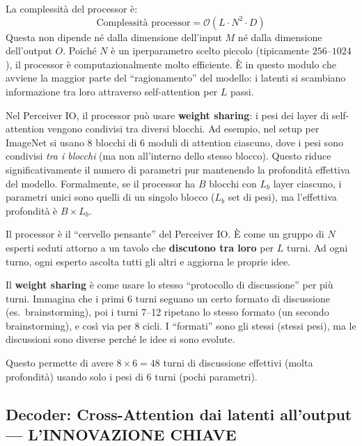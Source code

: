 \documentclass[12pt,a4paper]{article}
\begin{document}
\begin{notabox}
La complessit\`a del processor \`e:
\[
\text{Complessit\`a processor} = \mathcal{O}(L \cdot N^2 \cdot D)
\]
Questa non dipende n\'e dalla dimensione dell'input $M$ n\'e dalla dimensione dell'output $O$. Poich\'e $N$ \`e un iperparametro scelto piccolo (tipicamente $256$--$1024$), il processor \`e computazionalmente molto efficiente. \`E in questo modulo che avviene la maggior parte del ``ragionamento'' del modello: i latenti si scambiano informazione tra loro attraverso self-attention per $L$ passi.
\end{notabox}

\begin{notabox}
Nel Perceiver IO, il processor pu\`o usare \textbf{weight sharing}: i pesi dei layer di self-attention vengono condivisi tra diversi blocchi. Ad esempio, nel setup per ImageNet si usano 8 blocchi di 6 moduli di attention ciascuno, dove i pesi sono condivisi \emph{tra i blocchi} (ma non all'interno dello stesso blocco). Questo riduce significativamente il numero di parametri pur mantenendo la profondit\`a effettiva del modello. Formalmente, se il processor ha $B$ blocchi con $L_b$ layer ciascuno, i parametri unici sono quelli di un singolo blocco ($L_b$ set di pesi), ma l'effettiva profondit\`a \`e $B \times L_b$.
\end{notabox}

\begin{notabox}
Il processor \`e il ``cervello pensante'' del Perceiver IO. \`E come un gruppo di $N$ esperti seduti attorno a un tavolo che \textbf{discutono tra loro} per $L$ turni. Ad ogni turno, ogni esperto ascolta tutti gli altri e aggiorna le proprie idee.

Il \textbf{weight sharing} \`e come usare lo stesso ``protocollo di discussione'' per pi\`u turni. Immagina che i primi 6 turni seguano un certo formato di discussione (es.\ brainstorming), poi i turni 7--12 ripetano lo stesso formato (un secondo brainstorming), e cos\`i via per 8 cicli. I ``formati'' sono gli stessi (stessi pesi), ma le discussioni sono diverse perch\'e le idee si sono evolute.

Questo permette di avere $8 \times 6 = 48$ turni di discussione effettivi (molta profondit\`a) usando solo i pesi di 6 turni (pochi parametri).
\end{notabox}


\subsection{Decoder: Cross-Attention dai latenti all'output --- L'INNOVAZIONE CHIAVE}
\end{document}
